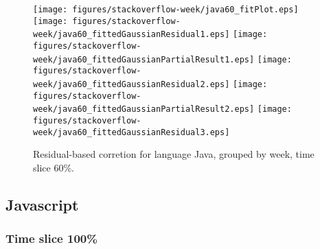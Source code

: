 \begin{figure}[t]
\centering
{}
{\texttt{[image: figures/stackoverflow-week/java60\_fitPlot.eps]}}
{\texttt{[image: figures/stackoverflow-week/java60\_fittedGaussianResidual1.eps]}}
{\texttt{[image: figures/stackoverflow-week/java60\_fittedGaussianPartialResult1.eps]}}
{\texttt{[image: figures/stackoverflow-week/java60\_fittedGaussianResidual2.eps]}}
{\texttt{[image: figures/stackoverflow-week/java60\_fittedGaussianPartialResult2.eps]}}
{\texttt{[image: figures/stackoverflow-week/java60\_fittedGaussianResidual3.eps]}}
\caption{Residual-based corretion for language Java, grouped by week, time slice 60\%.}
\end{figure}


\FloatBarrier


\subsection{Javascript}

\subsubsection{Time slice 100\%}

